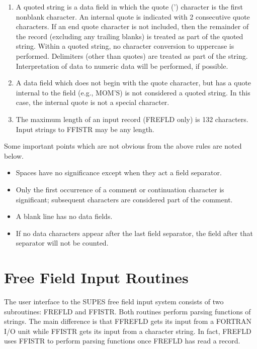 \begin{enumerate}
\item A quoted string is a data field in which the quote (') character is
the first nonblank character. An internal quote is indicated with 2
consecutive quote characters. If an end quote character is not included,
then the remainder of the record (excluding any trailing blanks) is treated
as part of the quoted string. Within a quoted string, no character
conversion to uppercase is performed. Delimiters (other than quotes) are
treated as part of the string. Interpretation of data to numeric data will
be performed, if possible.

\item A data field which does not begin with the quote character, but has a
quote internal to the field (e.g., MOM'S) is not considered a quoted string.
In this case, the internal quote is not a special character.

\item The maximum length of an input record (FREFLD only) is 132 characters.
Input strings to FFISTR may be any length.
\end{enumerate}

Some important points which are not obvious from the above rules are noted
below.
\begin{itemize}
\item Spaces have no significance except when they act a field separator.

\item Only the first occurrence of a comment or continuation character is
  significant; subsequent characters are considered part of the comment.

\item A blank line has no data fields.

\item If no data characters appear after the last field separator, the field
  after that separator will not be counted.
\end{itemize}

\section{Free Field Input Routines}

The user interface to the SUPES free field input system consists of two
subroutines: FREFLD and FFISTR. Both routines perform parsing functions of
strings. The main difference is that FFREFLD gets its input from a FORTRAN
I/O unit while FFISTR gets its input from a character string. In fact,
FREFLD uses FFISTR to perform parsing functions once FREFLD has read a
record.


